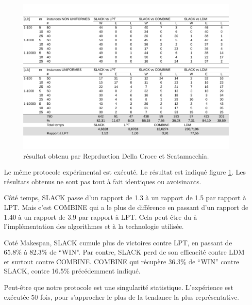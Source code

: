 \documentclass[a4paper,12pt]{report}
\theoremstyle{plain}				%
\theoremstyle{definition}				%
\begin{document}
\begin{figure}
{\centering
\includegraphics[width=\columnwidth]{3_Resultat_Reproduction_De_DCS.pdf}
\caption{résultat obtenu par Reprduction Della Croce et Scatamacchia.}
\label{fig:resultatReproductionDellaCroceScatamacchia}
\par}
\end{figure}

Le même protocole expérimental est exécuté. Le résultat est indiqué 
  figure \ref{fig:resultatReproductionDellaCroceScatamacchia}. 
Les résultats obtenus ne sont pas tout à fait identiques ou avoisinants. 
  
Côté temps, SLACK passe d'un rapport de 1.3 à un rapport de 1.5 par rapport à LPT. 
Mais c'est COMBINE qui a le plus de différence en passant d'un rapport de 1.40 
  à un rapport de 3.9 par rapport à LPT. 
Cela peut être du à l'implémentation des algorithmes et à la technologie utilisée. 

Coté Makespan, SLACK cumule plus de victoires contre LPT, en passant de 65.8\% à 82.3\% de ``WIN''.
Par contre, SLACK perd de son efficacité contre LDM et surtout contre COMBINE. COMBINE qui récupère 36.3\% de ``WIN'' contre SLACK, contre 16.5\% précédemment indiqué.

Peut-être que notre protocole est une singularité statistique. L'expérience est exécutée 50 fois, pour s'approcher le plus de la tendance la plus représentative.
\end{document}
